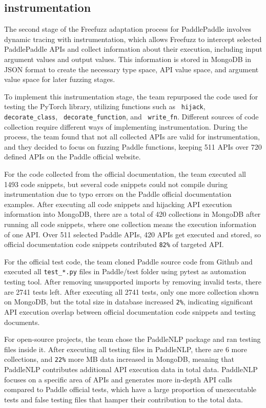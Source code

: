 \documentclass[sigconf]{acmart}
\begin{document}
  \subsection{instrumentation}
  \par The second stage of the Freefuzz adaptation process for PaddlePaddle involves dynamic tracing with instrumentation, which allows Freefuzz to intercept selected PaddlePaddle APIs and collect information about their execution, including input argument values and output values. This information is stored in MongoDB in JSON format to create the necessary type space, API value space, and argument value space for later fuzzing stages.
  \par To implement this instrumentation stage, the team repurposed the code used for testing the PyTorch library, utilizing functions such as \verb| hijack|, \verb| decorate_class|, \verb| decorate_function|, and \verb| write_fn|. Different sources of code collection require different ways of implementing instrumentation. During the process, the team found that not all collected APIs are valid for instrumentation, and they decided to focus on fuzzing Paddle functions, keeping 511 APIs over 720 defined APIs on the Paddle official website.
  \par For the code collected from the official documentation, the team executed all 1493 code snippets, but several code snippets could not compile during instrumentation due to typo errors on the Paddle official documentation examples. After executing all code snippets and hijacking API execution information into MongoDB, there are a total of 420 collections in MongoDB after running all code snippets, where one collection means the execution information of one API. Over 511 selected Paddle APIs, 420 APIs get executed and stored, so official documentation code snippets contributed \verb|82%| of targeted API.
  \par For the official test code, the team cloned Paddle source code from Github and executed all \verb|test_*.py| files in Paddle/test folder using pytest as automation testing tool. After removing unsupported imports by removing invalid tests, there are 2741 tests left. After executing all 2741 tests, only one more collection shown on MongoDB, but the total size in database increased  \verb|2%|, indicating significant API execution overlap between official documentation code snippets and testing documents.
  \par For open-source projects, the team chose the PaddleNLP package and ran testing files inside it. After executing all testing files in PaddleNLP, there are 6 more collections, and \verb|22%| more MB data increased in MongoDB, meaning that PaddleNLP contributes additional API execution data in total data. PaddleNLP focuses on a specific area of APIs and generates more in-depth API calls compared to Paddle official tests, which have a large proportion of unexecutable tests and false testing files that hamper their contribution to the total data.
  
\end{document}
